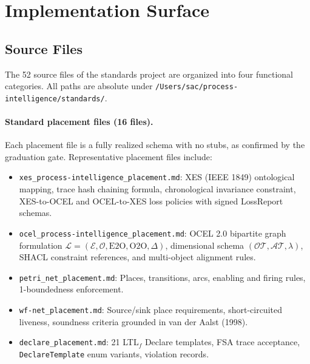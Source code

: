 
\section{Implementation Surface}
\label{sec:standards-impl}

\subsection{Source Files}
\label{sec:standards-impl-sources}

The 52 source files of the standards project are organized into four functional categories.
All paths are absolute under \texttt{/Users/sac/process-intelligence/standards/}.

\paragraph{Standard placement files (16 files).}
Each placement file is a fully realized schema with no stubs, as confirmed by the
graduation gate. Representative placement files include:
\begin{itemize}
  \item \texttt{xes\_process-intelligence\_placement.md}: XES (IEEE 1849) ontological
        mapping, trace hash chaining formula, chronological invariance constraint, XES-to-OCEL
        and OCEL-to-XES loss policies with signed LossReport schemas.
  \item \texttt{ocel\_process-intelligence\_placement.md}: OCEL 2.0 bipartite graph
        formulation $\mathcal{L}=(\mathcal{E}, \mathcal{O}, \text{E2O}, \text{O2O}, \Delta)$,
        dimensional schema $(\mathcal{OT}, \mathcal{AT}, \lambda)$, SHACL constraint
        references, and multi-object alignment rules.
  \item \texttt{petri\_net\_placement.md}: Places, transitions, arcs, enabling and firing
        rules, 1-boundedness enforcement.
  \item \texttt{wf-net\_placement.md}: Source/sink place requirements, short-circuited
        liveness, soundness criteria grounded in van der Aalst (1998).
  \item \texttt{declare\_placement.md}: 21 LTL$_f$ Declare templates, FSA trace
        acceptance, \texttt{DeclareTemplate} enum variants, violation records.
\end{itemize}

